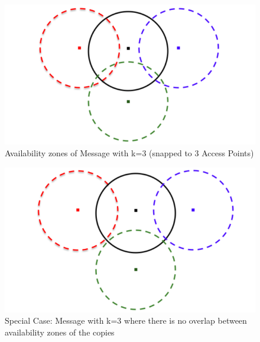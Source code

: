 	\vspace{1mm}
	\begin{figure}[h!]
		\centering
		\includegraphics[scale=0.35]{./figures/snapped-to-ap-3}
		\caption{Availability zones of Message with k=3 (snapped to 3 Access Points)}
	\end{figure}
	\begin{figure}[h!]
		\centering
		\includegraphics[scale=0.35]{./figures/snapped-to-ap-4}
		\caption{Special Case: Message with k=3 where there is no overlap between availability zones of the copies}
	\end{figure}

\newpage
